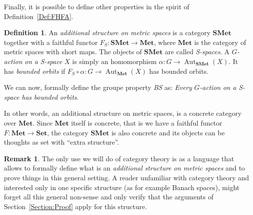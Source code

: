\documentclass[a4paper]{article}
\theoremstyle{definition}
\newtheorem{defn}[lem]{Definition}
\newtheorem{rem}[lem]{Remark}
\DeclareMathOperator\Hom{Hom}
\DeclareMathOperator\Aut{Aut}
\begin{document}
Finally, it is possible to define other properties in the spirit of Definition~\ref{Def:FHFA}.
%
%
%
%
%
\begin{defn}\label{Def:Categoric}
An \emph{additional structure on metric spaces} is a category $\mathbf{SMet}$ together with a faithful functor $F_{S}\colon \mathbf{SMet}\to \mathbf{Met}$, where $\mathbf{Met}$ is the category of metric spaces with short maps.
The objects of $\mathbf{SMet}$ are called \emph{S-spaces}.
A \emph{$G$-action on a S-space} $X$ is simply an homomorphism $\alpha\colon G\to\Aut_{\mathbf{SMet}}(X)$. It has \emph{bounded orbits} if $F_S\circ \alpha\colon G\to \Aut_{\mathbf{Met}}(X)$ has bounded orbits.

We can now, formally define the groupe property \emph{BS} as: \emph{Every $G$-action on a S-space has bounded orbits}.
\end{defn}
%
%
In other words, an additional structure on metric spaces, is a concrete category over $\mathbf{Met}$. Since $\mathbf{Met}$ itself is concrete, that is we have a faithful functor $F\colon \mathbf{Met}\to\mathbf{Set}$, the category $\mathbf{SMet}$ is also concrete and its objects can be thoughts as set with ``extra structure''.
%
%
\begin{rem}
The only use we will do of category theory is as a language that allows to formally define what is an \emph{additional structure on metric spaces} and to prove things in this general setting.
A reader unfamiliar with category theory and interested only in one specific structure (as for example Banach spaces), might forget all this general non-sense and only verify that the arguments of Section~\ref{Section:Proof} apply for this structure.
\end{rem}
\end{document}
